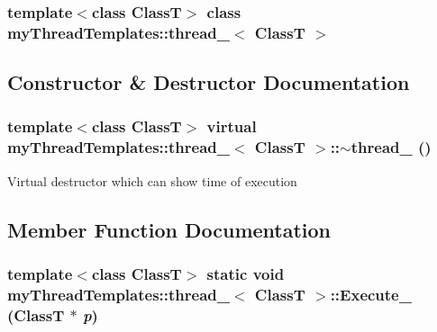 \subsubsection*{template$<$class ClassT$>$ class myThreadTemplates::thread\_$<$ ClassT $>$}



\subsection{Constructor \& Destructor Documentation}
\hypertarget{classmyThreadTemplates_1_1thread__1_aab0cedc80707090ec300be40e68c19c1}{
\subsubsection[{$\sim$thread\_\-1}]{\setlength{\rightskip}{0pt plus 5cm}template$<$class ClassT$>$ virtual {\bf myThreadTemplates::thread\_}$<$ ClassT $>$::$\sim${\bf thread\_} ()}}
\label{classmyThreadTemplates_1_1thread__1_aab0cedc80707090ec300be40e68c19c1}


Virtual destructor which can show time of execution 



\subsection{Member Function Documentation}
\hypertarget{classmyThreadTemplates_1_1thread__1_a24e615ac4afa0d376faefd500ed47e43}{
\subsubsection[{Execute\_\-}]{\setlength{\rightskip}{0pt plus 5cm}template$<$class ClassT$>$ static void {\bf myThreadTemplates::thread\_}$<$ ClassT $>$::Execute\_\- (ClassT $\ast$ {\em p})}}
\label{classmyThreadTemplates_1_1thread__1_a24e615ac4afa0d376faefd500ed47e43}



